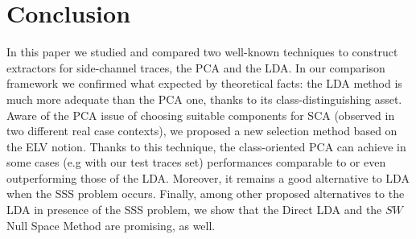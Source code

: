 \section{Conclusion}\label{sec:conclusions}

In this paper we studied and compared two well-known techniques to construct extractors for side-channel traces, the PCA and the LDA. In our comparison framework we confirmed what expected by theoretical facts: the LDA method is much more adequate than the PCA one, thanks to its class-distinguishing asset. Aware of the PCA issue of choosing suitable components for SCA (observed in two different real case contexts), we proposed a new selection method based on the ELV notion. Thanks to this technique, the class-oriented PCA can achieve in some cases (e.g with our test traces set) performances comparable to or even outperforming those of the LDA. Moreover, it remains a good alternative to LDA when the SSS problem occurs. Finally, among other proposed alternatives to the LDA in presence of the SSS problem, we show that the Direct LDA and the $SW$ Null Space Method are promising, as well.


